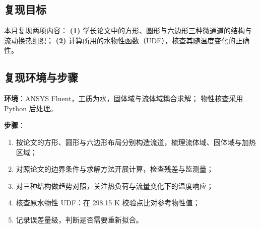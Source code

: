 \documentclass[stage1,fontset=fandol]{ydzjreport}
\begin{document}
	\subsection{复现目标}
	
	本月复现两项内容：
	\textbf{(1)} 学长论文中的方形、圆形与六边形三种微通道的结构与流动换热组织；
	\textbf{(2)} 计算所用的水物性函数（UDF），核查其随温度变化的正确性。
	
	\subsection{复现环境与步骤}
	
	\textbf{环境}：ANSYS Fluent，工质为水，固体域与流体域耦合求解；
	物性核查采用 Python 后处理。
	
	\textbf{步骤}：
	
	\begin{enumerate}
		\item 按论文的方形、圆形与六边形布局分别构造流道，梳理流体域、固体域与加热区域；
		\item 对照论文的边界条件与求解方法开展计算，检查残差与监测量；
		\item 对三种结构做趋势对照，关注热负荷与流量变化下的温度响应；
		\item 核查原水物性 UDF：在 298.15 K 校验点比对参考物性值；
		\item 记录误差量级，判断是否需要重新拟合。
	\end{enumerate}
\end{document}
